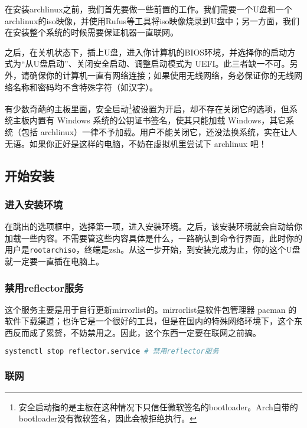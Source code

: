 \documentclass[../main.tex]{subfiles}
\begin{document}
在安装archlinux之前，我们首先要做一些前置的工作。我们需要一个U盘和一个archlinux的iso映像，并使用Rufus等工具将iso映像烧录到U盘中；另一方面，我们在安装整个系统的时候需要保证机器一直联网。

之后，在关机状态下，插上U盘，进入你计算机的BIOS环境，并选择你的启动方式为“从U盘启动”、关闭安全启动、调整启动模式为 UEFI。此三者缺一不可。另外，请确保你的计算机一直有网络连接；如果使用无线网络，务必保证你的无线网络名称和密码均不含特殊字符（如汉字）。

\begin{note}
  有少数奇葩的主板里面，安全启动\footnote{安全启动指的是主板在这种情况下只信任微软签名的bootloader。Arch自带的bootloader没有微软签名，因此会被拒绝执行。}被设置为开启，却不存在关闭它的选项，但系统主板内置有 Windows 系统的公钥证书签名，使其只能加载 Windows，其它系统（包括 archlinux）一律不予加载。用户不能关闭它，还没法换系统，实在让人无语。如果你正好是这样的电脑，不妨在虚拟机里尝试下 archlinux 吧！
\end{note}

\subsection{开始安装}

\subsubsection{进入安装环境}

在跳出的选项框中，选择第一项，进入安装环境。之后，该安装环境就会自动给你加载一些内容。不需要管这些内容具体是什么，一路确认到命令行界面，此时你的用户是\texttt{root\@ archiso}，终端是zsh。从这一步开始，到安装完成为止，你的这个U盘就一定要一直插在电脑上。

\subsubsection{禁用reflector服务}

这个服务主要是用于自行更新mirrorlist的。mirrorlist是软件包管理器 pacman 的软件下载渠道；也许它是一个很好的工具，但是在国内的特殊网络环境下，这个东西反而成了累赘，不妨禁用之。因此，这个东西一定要在联网之前搞。

\begin{lstlisting}[language=bash]
  systemctl stop reflector.service # 禁用reflector服务
\end{lstlisting}

\subsubsection{联网}
\end{document}
